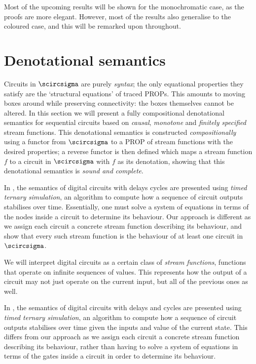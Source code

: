 \documentclass{lmcs}
\begin{document}
Most of the upcoming results will be shown for the monochromatic case, as the
proofs are more elegant.
However, most of the results also generalise to the coloured case, and this will
be remarked upon throughout.

\section{Denotational semantics}

Circuits in \(\scircsigma\) are purely \emph{syntax}; the only equational
properties they satisfy are the `structural equations' of traced PROPs.
This amounts to moving boxes around while preserving connectivity: the boxes
themselves cannot be altered.
In this section we will present a fully compositional denotational
semantics for sequential circuits based on \emph{causal}, \emph{monotone} and
\emph{finitely specified} stream functions.
This denotational semantics is constructed \emph{compositionally} using a
functor from \(\scircsigma\) to a PROP of stream functions with the desired
properties; a reverse functor is then defined which maps a stream function \(f\)
to a circuit in \(\scircsigma\) with \(f\) as its denotation, showing that this
denotational semantics is \emph{sound and complete}.

\begin{rem}
    In \cite{mendler2012constructive}, the semantics of digital circuits with
    delays cycles are presented using \emph{timed ternary simulation}, an
    algorithm to compute how a sequence of circuit outputs stabilises over time.
    Essentially, one must solve a system of equations in terms of the nodes
    inside a circuit to determine its behaviour.
    Our approach is different as we assign each circuit a concrete stream
    function describing its behaviour, and show that every such stream function
    is the behaviour of at least one circuit in \(\scircsigma\).
\end{rem}

We will interpret digital circuits as a certain class of
\emph{stream functions}, functions that operate on infinite sequences of values.
This represents how the output of a circuit may not just operate on the current
input, but all of the previous ones as well.

\begin{rem}
    In \cite{mendler2012constructive}, the semantics of digital circuits with
    delays and cycles are presented using \emph{timed ternary simulation}, an
    algorithm to compute how a sequence of circuit outputs stabilises over time
    given the inputs and value of the current state.
    This differs from our approach as we assign each circuit a concrete stream
    function describing its behaviour, rather than having to solve a system of
    equations in terms of the gates inside a circuit in order to determine its
    behaviour.
\end{rem}
\end{document}
